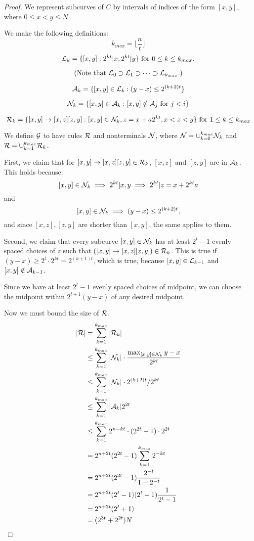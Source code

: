 \begin{proof}
We represent subcurves of $C$ by intervals of indices of the form
$[x,y]$, where $0\le x < y \le N$.

We make the following definitions:
$$k_{max} = \lfloor \frac{n}{t} \rfloor$$
$${\mathcal L}_k = \{ [x,y] : 2^{kt} | x, 2^{kt} | y \} \mbox{ for } 0 \le k \le k_{max}.$$ 

$$\mbox{(Note that } {\mathcal L}_0 \supset {\mathcal L}_1 \supset \cdots \supset {\mathcal L}_{k_{max}}.)$$

$${\mathcal A}_k = \{ [x,y] \in {\mathcal L}_k : (y-x) \le 2^{(k+2)t}\}$$

$${\mathcal N}_k = \{ [x,y] \in {\mathcal A}_k : [x,y] \notin {\mathcal A}_j \mbox{ for } j
< i \}$$

$${\mathcal R}_k = \{ [x,y] \to [x, z] [z, y] : [x,y] \in
{\mathcal N}_k, z = x + a2^{kt}, x < z < y \}\mbox{ for } 1\le k \le k_{max}$$

We define ${\mathcal G}$ to have rules ${\mathcal R}$ and nonterminals ${\mathcal N}$, where
${\mathcal N} = \cup_{k=0}^{k_{max}} {\mathcal N}_k$ and
 ${\mathcal R} = \cup_{k=1}^{k_{max}} {\mathcal R}_k$.

First, we claim that for $[x,y]\to [x,z][z,y]\in {\mathcal R}_k$, $[x,z]$ and
$[z,y]$ are in ${\mathcal A}_k$. This holds because:
$$[x,y]\in {\mathcal N}_k \implies 2^{kt} | x,y \implies 2^{kt} | z = x + 2^{kt}a$$
and
$$[x,y]\in {\mathcal N}_k \implies (y-x) \le 2^{(k+2)t},$$ and since $[x,z],
[z,y]$ are shorter than $[x,y]$, the same applies to them.

Second, we claim that every subcurve $[x,y]\in {\mathcal N}_k$ has at least
$2^t - 1$ evenly spaced choices of $z$ such that $([x,y] \to [x,z]
[z,y]) \in {\mathcal R}_k$. This is true if $(y-x) \ge 2^t \cdot 2^{kt} =
2^{(k+1)t}$, which is true, because $[x,y] \in {\mathcal L}_{k-1}$ and
$[x,y]\notin {\mathcal A}_{k-1}$.

Since we have at least $2^t - 1$ evenly spaced choices of midpoint, we
can choose the midpoint within $2^{t+1} (y-x)$ of any desired
midpoint.

Now we must bound the size of ${\mathcal R}$.
\begin{align*}
|{\mathcal R}| &= \sum_{k=1}^{k_{max}} |{\mathcal R}_k| \\
&\le \sum_{k=1}^{k_{max}} |{\mathcal N}_k| \cdot \frac{\max_{[x,y]\in{\mathcal N}_k} y-x }{2^{kt}}\\
&\le \sum_{k=1}^{k_{max}} |{\mathcal N}_k| \cdot 2^{(k+2)t} / 2^{kt}\\
&\le \sum_{k=1}^{k_{max}} |{\mathcal A}_k| 2^{2t}\\
&\le \sum_{k=1}^{k_{max}} 2^{n - kt} \cdot (2^{2t} - 1) \cdot 2^{2t}\\
&= 2^{n+2t}(2^{2t}-1) \sum_{k=1}^{k_{max}} 2^{-kt}\\
&= 2^{n+2t}(2^{2t}-1) \frac{2^{-t}}{1 - 2^{-t}}\\
&= 2^{n+2t}(2^{t}-1)(2^t + 1) \frac{1}{2^t - 1}\\
&= 2^{n+2t}(2^t + 1)\\
&= (2^{3t} + 2^{2t}) N
\end{align*}

\end{proof}

